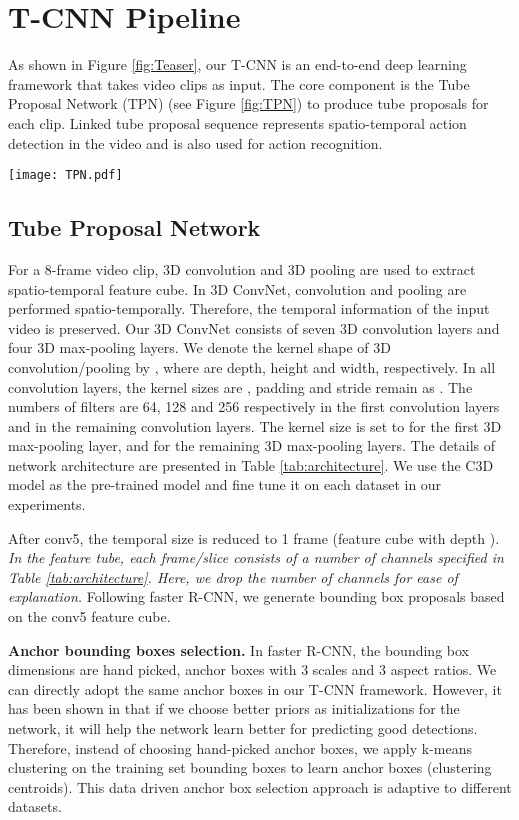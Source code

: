 \documentclass[10pt,twocolumn,letterpaper]{article}
\begin{document}
\section{T-CNN Pipeline}
\label{sec:approach}

As shown in Figure \ref{fig:Teaser}, our T-CNN is an end-to-end deep learning framework that takes video clips as input. The core component is the Tube Proposal Network (TPN) (see Figure \ref{fig:TPN}) to produce tube proposals for each clip. Linked tube proposal sequence represents spatio-temporal action detection in the video and is also used for action recognition.

\begin{figure*}[t]
	\centering
	\texttt{[image: TPN.pdf]}
	\caption{Tube proposal network. }
	\label{fig:TPN}
\end{figure*}




\subsection{Tube Proposal Network}
\label{sub-sec: tpn}
For a 8-frame video clip, 3D convolution and 3D pooling are used to extract spatio-temporal feature cube.
In 3D ConvNet, convolution and pooling are performed spatio-temporally. Therefore, the temporal information of the input video is preserved. Our 3D ConvNet consists of seven 3D convolution layers and four 3D max-pooling layers. We denote the kernel shape of 3D convolution/pooling by , where  are depth, height and width, respectively. In all convolution layers, the kernel sizes are , padding and stride remain as . The numbers of filters are 64, 128 and 256 respectively in the first  convolution layers and  in the remaining convolution layers.  The kernel size is set to  for the first 3D max-pooling layer, and  for the remaining 3D max-pooling layers. The details of network architecture are presented in Table \ref{tab:architecture}.  We use the C3D model \cite{c3d} as the pre-trained model and  fine tune it on each dataset in our experiments.

After conv5, the temporal size is reduced to 1 frame (\ie feature cube with depth ). \textit{In the feature tube, each frame/slice consists of a number of channels specified in Table \ref{tab:architecture}. Here, we drop the number of channels for ease of explanation.} Following faster R-CNN, we generate bounding box proposals based on the conv5 feature cube.

\textbf{Anchor bounding boxes selection.} In faster R-CNN, the bounding box dimensions are hand picked,  anchor boxes with 3 scales and 3 aspect ratios. We can directly adopt the same anchor boxes in our T-CNN framework. However, it has been shown in \cite{yolo9000} that if we choose better priors as initializations for the network, it will help the network learn better for predicting good detections.
Therefore, instead of choosing hand-picked anchor boxes, we apply k-means
clustering on the training set bounding boxes to learn  anchor boxes (\ie clustering centroids). This data driven anchor box selection approach is adaptive to different datasets.
\end{document}
